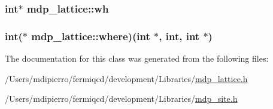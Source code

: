 \label{classmdp__lattice_a14892e721f56e142037c511bf6543e8d}
\hypertarget{classmdp__lattice_adeee5743b0c437ec58026c98a0a3229f}{
\subsubsection[{wh}]{\setlength{\rightskip}{0pt plus 5cm}int$\ast$ {\bf mdp\_\-lattice::wh}}}
\label{classmdp__lattice_adeee5743b0c437ec58026c98a0a3229f}
\hypertarget{classmdp__lattice_ab19daaab7f6821237da906395d675707}{
\subsubsection[{where}]{\setlength{\rightskip}{0pt plus 5cm}int($\ast$ {\bf mdp\_\-lattice::where})(int $\ast$, int, int $\ast$)}}
\label{classmdp__lattice_ab19daaab7f6821237da906395d675707}


The documentation for this class was generated from the following files:\begin{DoxyCompactItemize}
\item 
/Users/mdipierro/fermiqcd/development/Libraries/\hyperlink{mdp__lattice_8h}{mdp\_\-lattice.h}\item 
/Users/mdipierro/fermiqcd/development/Libraries/\hyperlink{mdp__site_8h}{mdp\_\-site.h}\end{DoxyCompactItemize}

